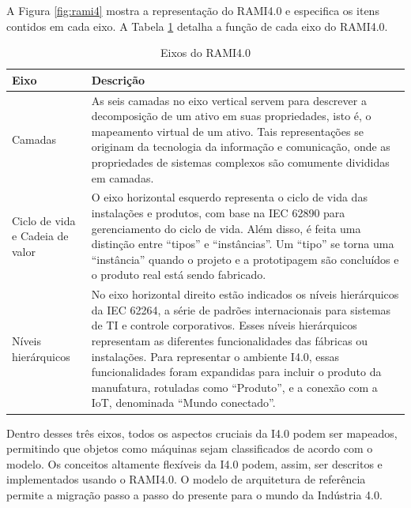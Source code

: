 \documentclass[
	12pt,				%
	oneside,			%
	a4paper,			%
	english,			%
	brazil				%
]{abntex2}
\begin{document}
	A Figura \ref{fig:rami4} mostra a representação do RAMI4.0 e especifica os itens contidos em cada eixo. A Tabela \ref{tab:rami-eixos} detalha a função de cada eixo do RAMI4.0.
	
	\begin{table}[H]
		\centering
		\caption{Eixos do RAMI4.0}
		\begin{tabular}{|p{1.3in}|p{4in}|}
			
			\hline
			\textbf{Eixo}
			&\textbf{Descrição} \\
			
			\hline
			Camadas
			& As seis camadas no eixo vertical servem para descrever a decomposição de um ativo em suas propriedades, isto é, o mapeamento virtual de um ativo. Tais representações se originam da tecnologia da informação e comunicação, onde as propriedades de sistemas complexos são comumente divididas em camadas. \\
			
			
			\hline
			Ciclo de vida e  Cadeia de valor
			& O eixo horizontal esquerdo representa o ciclo de vida das instalações e produtos, com base na IEC 62890 para gerenciamento do ciclo de vida. Além disso, é feita uma distinção entre ``tipos'' e ``instâncias''. Um ``tipo'' se torna uma ``instância'' quando o projeto e a prototipagem são concluídos e o produto real está sendo fabricado. \\
			
			\hline
			Níveis hierárquicos
			& No eixo horizontal direito estão indicados os níveis hierárquicos da IEC 62264, a série de padrões internacionais para sistemas de TI e controle corporativos. Esses níveis hierárquicos representam as diferentes funcionalidades das fábricas ou instalações. Para representar o ambiente I4.0, essas funcionalidades foram expandidas para incluir o produto da manufatura, rotuladas como ``Produto'', e a conexão com a IoT, denominada ``Mundo conectado''. \\
			\hline
			
		\end{tabular}
		\label{tab:rami-eixos}
	\end{table}
	
	Dentro desses três eixos, todos os aspectos cruciais da I4.0 podem ser mapeados, permitindo que objetos como máquinas sejam classificados de acordo com o modelo. Os conceitos altamente flexíveis da I4.0 podem, assim, ser descritos e implementados usando o RAMI4.0. O modelo de arquitetura de referência permite a migração passo a passo do presente para o mundo da Indústria 4.0.
	
\end{document}
